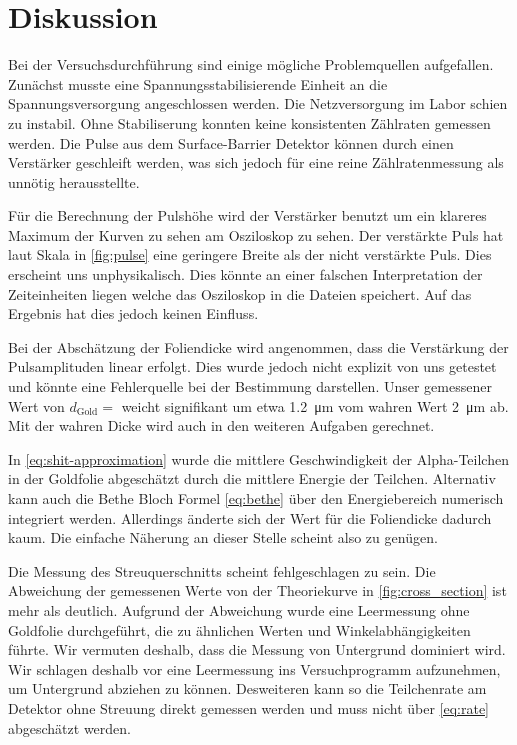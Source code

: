 \section{Diskussion}

Bei der Versuchsdurchführung sind einige mögliche Problemquellen aufgefallen.
Zunächst musste eine Spannungsstabilisierende Einheit an die Spannungsversorgung angeschlossen werden.
Die Netzversorgung im Labor schien zu instabil. Ohne Stabiliserung konnten keine konsistenten Zählraten gemessen werden.
Die Pulse aus dem Surface-Barrier Detektor können durch einen Verstärker geschleift werden, was sich jedoch für eine reine Zählratenmessung
als unnötig herausstellte.

Für die Berechnung der Pulshöhe wird der Verstärker benutzt um ein klareres Maximum der Kurven zu sehen am Osziloskop zu sehen.
Der verstärkte Puls hat laut Skala in \autoref{fig:pulse} eine geringere Breite als der nicht verstärkte Puls.
Dies erscheint uns unphysikalisch. Dies könnte an einer falschen Interpretation der Zeiteinheiten liegen welche das Osziloskop in die Dateien speichert.
Auf das Ergebnis hat dies jedoch keinen Einfluss.

Bei der Abschätzung der Foliendicke wird angenommen, dass die Verstärkung der Pulsamplituden linear erfolgt.
Dies wurde jedoch nicht explizit von uns getestet und könnte eine Fehlerquelle bei der Bestimmung darstellen.
Unser gemessener Wert von $d_\text{Gold} = $ weicht signifikant um etwa \SI{1.2}{\micro\meter} vom wahren Wert \SI{2}{\micro\meter} ab.
Mit der wahren Dicke wird auch in den weiteren Aufgaben gerechnet.

In \eqref{eq:shit-approximation} wurde die mittlere Geschwindigkeit der Alpha-Teilchen in der Goldfolie abgeschätzt durch die mittlere Energie der Teilchen.
Alternativ kann auch die Bethe Bloch Formel \eqref{eq:bethe} über den Energiebereich numerisch integriert werden.
Allerdings änderte sich der Wert für die Foliendicke dadurch kaum. Die einfache Näherung an dieser Stelle scheint also zu genügen.


Die Messung des Streuquerschnitts scheint fehlgeschlagen zu sein. Die Abweichung der gemessenen Werte von der Theoriekurve in \autoref{fig:cross_section} ist mehr als deutlich.
Aufgrund der Abweichung wurde eine Leermessung ohne Goldfolie durchgeführt, die zu ähnlichen Werten und Winkelabhängigkeiten führte.
Wir vermuten deshalb, dass  die Messung von Untergrund dominiert wird.
Wir schlagen deshalb vor eine Leermessung ins Versuchprogramm aufzunehmen, um Untergrund abziehen zu können.
Desweiteren kann so die Teilchenrate am Detektor ohne Streuung direkt gemessen werden und muss nicht über \eqref{eq:rate} abgeschätzt werden.

